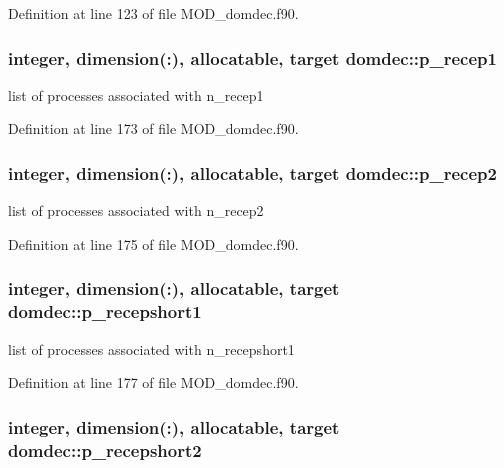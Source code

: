 Definition at line 123 of file M\-O\-D\-\_\-domdec.\-f90.

\hypertarget{classdomdec_aecd0d700c25dd92b90c3aff9ef2675d7}{
\subsubsection[{p\-\_\-recep1}]{\setlength{\rightskip}{0pt plus 5cm}integer, dimension(\-:), allocatable, target domdec\-::p\-\_\-recep1}}\label{classdomdec_aecd0d700c25dd92b90c3aff9ef2675d7}


list of processes associated with n\-\_\-recep1 



Definition at line 173 of file M\-O\-D\-\_\-domdec.\-f90.

\hypertarget{classdomdec_a713d6b0f5bb76b694b14d466e89e29dd}{
\subsubsection[{p\-\_\-recep2}]{\setlength{\rightskip}{0pt plus 5cm}integer, dimension(\-:), allocatable, target domdec\-::p\-\_\-recep2}}\label{classdomdec_a713d6b0f5bb76b694b14d466e89e29dd}


list of processes associated with n\-\_\-recep2 



Definition at line 175 of file M\-O\-D\-\_\-domdec.\-f90.

\hypertarget{classdomdec_a1dfc2e20e70c2f2071d5426210da1ed8}{
\subsubsection[{p\-\_\-recepshort1}]{\setlength{\rightskip}{0pt plus 5cm}integer, dimension(\-:), allocatable, target domdec\-::p\-\_\-recepshort1}}\label{classdomdec_a1dfc2e20e70c2f2071d5426210da1ed8}


list of processes associated with n\-\_\-recepshort1 



Definition at line 177 of file M\-O\-D\-\_\-domdec.\-f90.

\hypertarget{classdomdec_a1ca125848ba21ab0b69170dbb7b55a06}{
\subsubsection[{p\-\_\-recepshort2}]{\setlength{\rightskip}{0pt plus 5cm}integer, dimension(\-:), allocatable, target domdec\-::p\-\_\-recepshort2}}\label{classdomdec_a1ca125848ba21ab0b69170dbb7b55a06}


